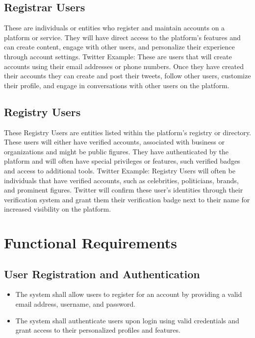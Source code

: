 \documentclass{article}
\begin{document}
\subsection{Registrar Users}
These are individuals or entities who register and maintain accounts on a platform or service. They will have direct access to the platform’s features and can create content, engage with other users, and personalize their experience through account settings. Twitter Example: These are users that will create accounts using their email addresses or phone numbers. Once they have created their accounts they can create and post their tweets, follow other users, customize their profile, and engage in conversations with other users on the platform.

\subsection{Registry Users}
These Registry Users are entities listed within the platform’s registry or directory. These users will either have verified accounts, associated with business or organizations and might be public figures. They have authenticated by the platform and will often have special privileges or features, such verified badges and access to additional tools. Twitter Example: Registry Users will often be individuals that have verified accounts, such as celebrities, politicians, brands, and prominent figures. Twitter will confirm these user’s identities through their verification system and grant them their verification badge next to their name for increased visibility on the platform.

\section{Functional Requirements}
\subsection{User Registration and Authentication}
\begin{itemize}[label=$\bullet$]
    \item The system shall allow users to register for an account by providing a valid email address, username, and password.
    \item The system shall authenticate users upon login using valid credentials and grant access to their personalized profiles and features.
\end{itemize}
\end{document}
